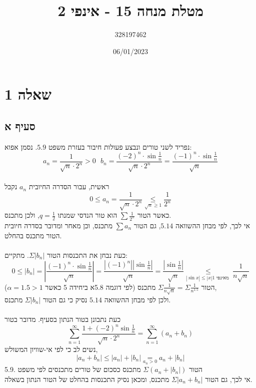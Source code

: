 \documentclass{article}
\title{מטלת מנחה 15 - אינפי 2}
\author{328197462}
\date{06/01/2023}
\newcommand\underrel[2]{\mathrel{\mathop{#2}\limits_{#1}}}
\begin{document}
\long{}
\maketitle

\section*{שאלה 1}

\subsection*{סעיף א}

נפריד לשני טורים ונבצע פעולות חיבור בעזרת משפט $5.9$. נסמן אפוא:
\[
    a_n = \frac{1}{\sqrt{n}\cdot 2^n}>0 \ \ \
    b_n = \frac{(-2)^n\cdot \sin \frac{1}{n}}{\sqrt{n}\cdot 2^n}
    = \frac{(-1)^n \cdot \sin \frac{1}{n}}{\sqrt{n}}
\]
\\
ראשית, עבור הסדרה החיובית $a_n$ נקבל
\[
    0\leq a_n = \frac{1}{\sqrt{n}\cdot 2^n} \underrel{\sqrt{n}\geq 1}{\leq} \frac{1}{2^n}
\]
כאשר הטור $\sum \frac{1}{2^n}$ הוא טור הנדסי שמנתו $q=\frac{1}{2}$, ולכן מתכנס. \\
אי לכך, לפי מבחן ההשוואה $5.14$, גם הטור $\sum a_n$ מתכנס, וכן מאחר ומדובר בסדרה חיובית הטור מתכנס בהחלט.
\\\\
כעת נבחן את התכנסות הטור $\Sigma|b_n|$. מתקיים:
\[
    0\leq|b_n|=\left|\frac{(-1)^n \cdot \sin \frac{1}{n}}{\sqrt{n}}\right| =
    \frac{|(-1)^n| |\sin \frac{1}{n}|}{\sqrt{n}}=
    \frac{|\sin \frac{1}{n}|}{\sqrt{n}} \underrel{|\sin x|\leq |x| \text{מאינפי 1 }}{\leq}
    \frac{1}{n\sqrt{n}}
\]
הטור $\Sigma \frac{1}{n\sqrt{n}}=\Sigma \frac{1}{n^{1.5}}$
מתכנס (לפי דוגמה 5.8א ביחידה 5 כאשר $\alpha=1.5>1$), \\
ולכן לפי מבחן ההשוואה $5.14$ נסיק כי גם הטור $\Sigma |b_n|$ מתכנס.
\\\\
כעת נתבונן בטור הנתון בסעיף. מדובר בטור
\[
    \sum_{n=1}^\infty \frac{1+(-2)^n\sin\frac{1}{n}}{\sqrt{n}\cdot 2^n}=
    \sum_{n=1}^\infty (a_n+b_n)
\]
נשים לב כי לפי אי-שוויון המשולש,
\[
    |a_n+b_n|\leq |a_n|+|b_n| \underrel{a_n>0}{=} a_n + |b_n|
\]
הטור $\Sigma(a_n +|b_n|)$ מתכנס כסכום של טורים מתכנסים לפי משפט .5.9 \\
אי לכך, גם הטור $\Sigma|a_n+b_n|$ מתכנס, ומכאן נסיק התכנסות בהחלט של הטור הנתון בשאלה.

\pagebreak
\end{document}
